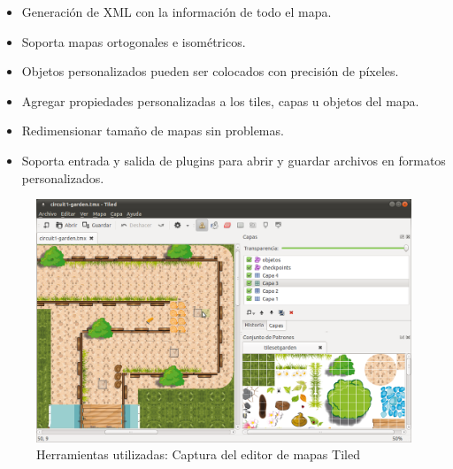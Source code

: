 \begin{itemize}
    \item Generación de XML con la información de todo el mapa.
    
    \item Soporta mapas ortogonales e isométricos.
    
    \item Objetos personalizados pueden ser colocados con precisión de píxeles.
    
    \item Agregar propiedades personalizadas a los tiles, capas u objetos del mapa.
    
    \item Redimensionar tamaño de mapas sin problemas.
    
    \item Soporta entrada y salida de plugins para abrir y guardar archivos en formatos personalizados.
\end{itemize}

\begin{figure}[H]
  \label{captura_tiled}
  \begin{center}
    \includegraphics[scale=0.35]{imagenes/captura_tiled.png}
  \end{center}
  \caption{Herramientas utilizadas: Captura del editor de mapas Tiled}
\end{figure}
